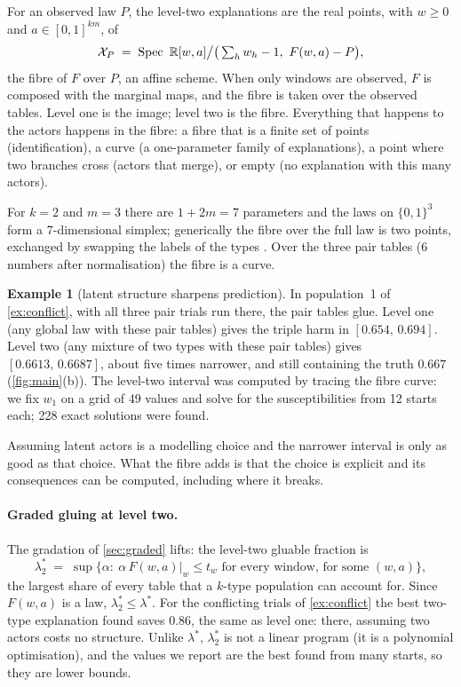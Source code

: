 \documentclass[11pt]{article}
\theoremstyle{definition}\newtheorem{definition}[theorem]{Definition}\newtheorem{remark}[theorem]{Remark}\newtheorem{example}[theorem]{Example}
\newcommand{\R}{\mathbb R}
\begin{document}
For an observed law $P$, the level-two explanations are the real points, with $w\ge0$ and $a\in[0,1]^{km}$, of
\[
  \mathcal X_P \;=\; \Spec\ \R[w,a]\big/\big(\textstyle\sum_h w_h-1,\ F(w,a)-P\big),
\]
the fibre of $F$ over $P$, an affine scheme. When only windows are observed, $F$ is composed with the marginal maps, and the fibre is
taken over the observed tables. Level one is the image; level two is the fibre. Everything that happens to the actors happens in the
fibre: a fibre that is a finite set of points (identification), a curve (a one-parameter family of explanations), a point where two
branches cross (actors that merge), or empty (no explanation with this many actors).

For $k=2$ and $m=3$ there are $1+2m=7$ parameters and the laws on $\{0,1\}^3$ form a 7-dimensional simplex; generically the fibre over
the full law is two points, exchanged by swapping the labels of the types \cite{AllmanMatiasRhodes2009}. Over the three pair tables
(6 numbers after normalisation) the fibre is a curve.

\begin{example}[latent structure sharpens prediction]\label{ex:sharpen}
In population~1 of \cref{ex:conflict}, with all three pair trials run there, the pair tables glue. Level one (any global law with these
pair tables) gives the triple harm in $[0.654,\,0.694]$. Level two (any mixture of two types with these pair tables) gives
$[0.6613,\,0.6687]$, about five times narrower, and still containing the truth $0.667$ (\cref{fig:main}(b)). The level-two interval was
computed by tracing the fibre curve: we fix $w_1$ on a grid of 49 values and solve for the susceptibilities from 12 starts each; 228
exact solutions were found.
\end{example}

Assuming latent actors is a modelling choice and the narrower interval is only as good as that choice. What the fibre adds is that the
choice is explicit and its consequences can be computed, including where it breaks.

\paragraph{Graded gluing at level two.}
The gradation of \cref{sec:graded} lifts: the level-two gluable fraction is
\[
  \lambda^*_2 \;=\; \sup\{\alpha:\ \alpha\,F(w,a)|_w\le t_w \text{ for every window, for some } (w,a)\},
\]
the largest share of every table that a $k$-type population can account for. Since $F(w,a)$ is a law, $\lambda_2^*\le\lambda^*$. For the
conflicting trials of \cref{ex:conflict} the best two-type explanation found saves $0.86$, the same as level one: there, assuming two
actors costs no structure. Unlike $\lambda^*$, $\lambda^*_2$ is not a linear program (it is a polynomial optimisation), and the values we
report are the best found from many starts, so they are lower bounds.
\end{document}
